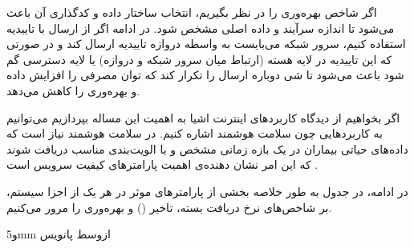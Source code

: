 اگر شاخص بهره‌وری را در نظر بگیریم، انتخاب ساختار داده و کدگذاری آن باعث می‌شود تا اندازه سرآیند و داده اصلی مشخص شود.
در ادامه اگر از ارسال با تاییدیه استفاده کنیم، سرور شبکه می‌بایست به واسطه دروازه تاییدیه ارسال کند و در صورتی
که این تاییدیه در لایه هسته (ارتباط میان سرور شبکه و دروازه) یا لایه دسترسی گم شود باعث می‌شود تا شی
دوباره ارسال را تکرار کند که توان مصرفی را افزایش داده و بهره‌وری را کاهش می‌دهد.

اگر بخواهیم از دیدگاه کاربردهای اینترنت اشیا به اهمیت این مساله بپردازیم می‌توانیم به کاربردهایی چون سلامت هوشمند اشاره کنیم.
در سلامت هوشمند نیاز است که داده‌های حیاتی بیماران در یک بازه زمانی مشخص و با الویت‌بندی مناسب دریافت شوند که این امر
نشان دهنده‌ی اهمیت پارامترهای کیفیت سرویس است .

در ادامه، در جدول 
به طور خلاصه بخشی از پارامترهای موثر در هر یک از اجزا سیستم،
بر شاخص‌های نرخ دریافت بسته، تاخیر () و بهره‌وری را مرور می‌کنیم.


‌و{5mm}
‌ازوسط
‌پانویس

